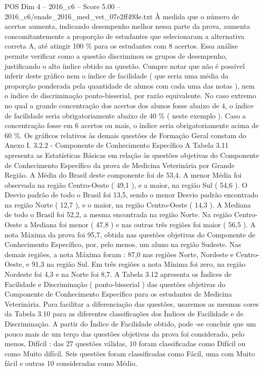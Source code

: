 \begin{textsample}{POS Dim 4 – 2016\_c6 – Score 5.00 – 2016\_c6/enade\_2016\_med\_vet\_07e2ff493e.txt}
À medida que o número de acertos aumenta, indicando desempenho melhor nessa parte da prova, aumenta concomitantemente a proporção de estudantes que selecionaram a alternativa correta A, até atingir 100 \% para os estudantes com 8 acertos.
Essa análise permite verificar como a questão discriminou os grupos de desempenho, justificando o alto índice obtido na questão.
Cumpre notar que não é possível inferir deste gráfico nem o índice de facilidade ( que seria uma média da proporção ponderada pela quantidade de alunos com cada uma das notas ), nem o índice de discriminação ponto-bisserial, por razão equivalente.
No caso extremo no qual a grande concentração dos acertos dos alunos fosse abaixo de 4, o índice de facilidade seria obrigatoriamente abaixo de 40 \% ( neste exemplo ).
Caso a concentração fosse em 6 acertos ou mais, o índice seria obrigatoriamente acima de 60 \%.
Os gráficos relativos às demais questões de Formação Geral constam do Anexo I. 3.2.2 - Componente de Conhecimento Específico A Tabela 3.11 apresenta as Estatísticas Básicas em relação às questões objetivas do Componente de Conhecimento Específico da prova de Medicina Veterinária por Grande Região.
A Média do Brasil deste componente foi de 53,4.
A menor Média foi observada na região Centro-Oeste ( 49,1 ), e a maior, na região Sul ( 54,6 ).
O Desvio padrão de todo o Brasil foi 13,5, sendo o menor Desvio padrão encontrado na região Norte ( 12,7 ), e o maior, na região Centro-Oeste ( 14,3 ).
A Mediana de todo o Brasil foi 52,2, a mesma encontrada na região Norte.
Na região Centro-Oeste a Mediana foi menor ( 47,8 ) e nas outras três regiões foi maior ( 56,5 ).
A nota Máxima da prova foi 95,7, obtida nas questões objetivas do Componente de Conhecimento Específico, por, pelo menos, um aluno na região Sudeste.
Nas demais regiões, a nota Máxima foram : 87,0 nas regiões Norte, Nordeste e Centro-Oeste, e 91,3 na região Sul.
Em três regiões a nota Mínima foi zero, na região Nordeste foi 4,3 e na Norte foi 8,7.
A Tabela 3.12 apresenta os Índices de Facilidade e Discriminação ( ponto-bisserial ) das questões objetivas do Componente de Conhecimento Específico para os estudantes de Medicina Veterinária.
Para facilitar a diferenciação das questões, usaremos as mesmas cores da Tabela 3.10 para as diferentes classificações dos Índices de Facilidade e de Discriminação.
A partir do Índice de Facilidade obtido, pode -se concluir que um pouco mais de um terço das questões objetivas da prova foi considerado, pelo menos, Difícil : das 27 questões válidas, 10 foram classificadas como Difícil ou como Muito difícil.
Seis questões foram classificadas como Fácil, uma com Muito fácil e outras 10 consideradas como Médio.

\end{textsample}

